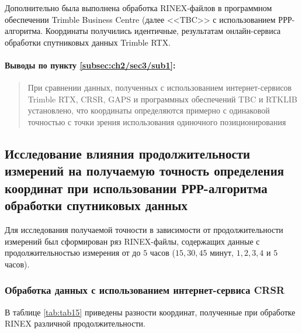 Дополнительно была выполнена обработка RINEX-файлов в программном обеспечении Trimble Business Centre (далее <<TBC>> с использованием РРР-алгоритма. Координаты получились идентичные, результатам онлайн-сервиса обработки спутниковых данных Trimble RTX.

\paragraph{Выводы по пункту \cref{subsec:ch2/sec3/sub1}: } 
\begin{quote}
	При сравнении данных, полученных с использованием интернет-сервисов Trimble RTX, CRSR, GAPS и программных обеспечений TBC и RTKLIB установлено, что координаты определяются примерно с одинаковой точностью с точки зрения использования одиночного позиционирования
\end{quote}





\subsection[Влияние продолжительности измерений]{Исследование влияния продолжительности измерений на получаемую точность определения координат при использовании РРР-алгоритма обработки спутниковых данных}\label{subsec:ch2/sec3/sub2}

Для исследования получаемой точности в зависимости от продолжительности измерений был сформирован ряз RINEX-файлы, содержащих данные с продолжительностью измерения от  до $5$ часов ($15, 30, 45$ минут, $1, 2, 3, 4$ и $5$ часов).


\subsubsection{Обработка данных с использованием интернет-сервиса CRSR }\label{subsec:ch2/sec3/sub2/sub1}

В таблице \cref{tab:tab15} приведены разности координат, полученные при обработке RINEX различной продолжительности.


